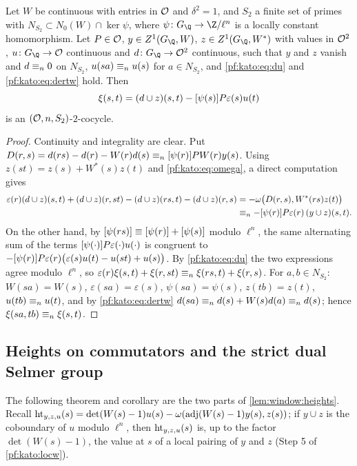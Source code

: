 \begin{lemma}\label{pf:kato:xi}
Let $W$ be continuous with entries in $\mathcal{O}$ and $\delta^2=1$, and $S_2$ a finite set of primes with
$N_{S_2}\subset N_0(W)\cap\ker\psi$, where $\psi\colon G_\Q\to\Z/\ell^n$ is a locally constant homomorphism. Let $P\in\mathcal{O}$,
$y\in\katoZ(G_\Q,W)$, $z\in\katoZ(G_\Q,W^*)$ with values in $\mathcal{O}^2$, $u\colon G_\Q\to\katoO$ continuous and
$d\colon G_\Q\to\katoO^2$ continuous, such that $y$ and $z$ vanish and $d\equiv_{n}0$ on $N_{S_2}$, $u(sa)\equiv_{n}u(s)$ for
$a\in N_{S_2}$, and \eqref{pf:kato:eq:du} and \eqref{pf:kato:eq:dertw} hold. Then
\[
  \xi(s,t)=(d\cup z)(s,t)-[\psi(s)]P\varepsilon(s)u(t)
\]
is an $(\mathcal{O},n,S_2)$-$2$-cocycle.
\end{lemma}

\begin{proof}
Continuity and integrality are clear. Put $D(r,s)=d(rs)-d(r)-W(r)d(s)\equiv_{n}[\psi(r)]PW(r)y(s)$. Using $z(st)=z(s)+W^*(s)z(t)$ and
\eqref{pf:kato:eq:omega}, a direct computation gives
\[
\begin{aligned}
  \varepsilon(r)(d\cup z)(s,t)+(d\cup z)(r,st)-(d\cup z)(rs,t)-(d\cup z)(r,s)&=-\omega\bigl(D(r,s),W^*(rs)z(t)\bigr)\\
  &\equiv_{n}-[\psi(r)]P\varepsilon(r)\,(y\cup z)(s,t).
\end{aligned}
\]
On the other hand, by $[\psi(rs)]\equiv[\psi(r)]+[\psi(s)]$ modulo $\ell^n$, the same alternating sum of the
terms $[\psi(\cdot)]P\varepsilon(\cdot)u(\cdot)$ is congruent to $-[\psi(r)]P\varepsilon(r)\bigl(\varepsilon(s)u(t)-u(st)+u(s)\bigr)$. By
\eqref{pf:kato:eq:du} the two expressions agree modulo $\ell^n$, so $\varepsilon(r)\xi(s,t)+\xi(r,st)\equiv_{n}\xi(rs,t)+\xi(r,s)$. For
$a,b\in N_{S_2}$: $W(sa)=W(s)$, $\varepsilon(sa)=\varepsilon(s)$, $\psi(sa)=\psi(s)$, $z(tb)=z(t)$, $u(tb)\equiv_{n}u(t)$, and by
\eqref{pf:kato:eq:dertw} $d(sa)\equiv_{n}d(s)+W(s)d(a)\equiv_{n}d(s)$; hence $\xi(sa,tb)\equiv_{n}\xi(s,t)$.
\end{proof}

\subsection{Heights on commutators and the strict dual Selmer group}\label{pf:kato:sec:heights}

The following theorem and corollary are the two parts of \cref{lem:window:heights}. Recall
$\mathrm{ht}_{y,z,u}(s)=\det(W(s)-1)u(s)-\omega(\operatorname{adj}(W(s)-1)y(s),z(s))$; if $y\cup z$ is the coboundary of $u$ modulo
$\ell^n$, then $\mathrm{ht}_{y,z,u}(s)$ is, up to the factor $\det(W(s)-1)$, the value at $s$ of a local pairing of $y$ and $z$
(Step 5 of \cref{pf:kato:locw}).

